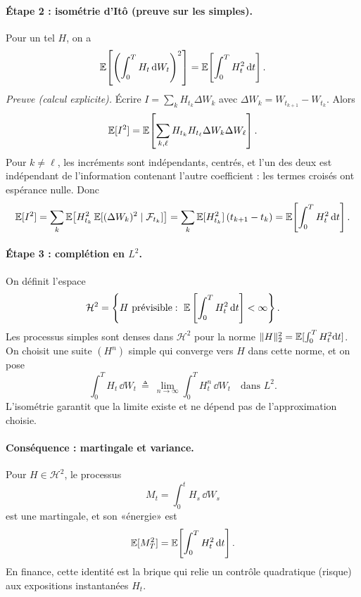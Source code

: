 \paragraph{Étape 2 : isométrie d'Itô (preuve sur les simples).}
Pour un tel $H$, on a
\[
\mathbb{E}\!\left[\left(\int_0^T H_t\,\mathrm{d} W_t\right)^2\right]
=\mathbb{E}\!\left[\int_0^T H_t^2\,\mathrm{d} t\right].
\]
\emph{Preuve (calcul explicite).}
Écrire $I=\sum_k H_{t_k}\Delta W_k$ avec $\Delta W_k=W_{t_{k+1}}-W_{t_k}$.
Alors
\[
\mathbb{E}[I^2]=\mathbb{E}\!\left[\sum_{k,\ell} H_{t_k}H_{t_\ell}\Delta W_k\Delta W_\ell\right].
\]
Pour $k\neq \ell$, les incréments sont indépendants, centrés, et l'un des deux est indépendant de l'information contenant l'autre coefficient : les termes croisés ont espérance nulle.
Donc
\[
\mathbb{E}[I^2]=\sum_k \mathbb{E}\!\left[H_{t_k}^2\,\mathbb{E}[(\Delta W_k)^2\mid \mathcal{F}_{t_k}]\right]
=\sum_k \mathbb{E}[H_{t_k}^2]\,(t_{k+1}-t_k)
=\mathbb{E}\!\left[\int_0^T H_t^2\,\mathrm{d} t\right].
\]

\paragraph{Étape 3 : complétion en $L^2$.}
On définit l'espace
\[
\mathcal{H}^2=\left\{H\ \text{prévisible}:\ \E\left[\int_0^T H_t^2\,\dd t\right]<\infty\right\}.
\]
Les processus simples sont denses dans $\mathcal{H}^2$ pour la norme $\|H\|_{2}^2=\mathbb{E}[\int_0^T H_t^2\mathrm{d} t]$.
On choisit une suite $(H^n)$ simple qui converge vers $H$ dans cette norme, et on pose
\[
\int_0^T H_t\,\dd W_t \ \triangleq\ \lim_{n\to\infty} \int_0^T H^n_t\,\dd W_t
\quad \text{dans } L^2.
\]
L'isométrie garantit que la limite existe et ne dépend pas de l'approximation choisie.

\paragraph{Conséquence : martingale et variance.}
Pour $H\in\mathcal{H}^2$, le processus
\[
M_t=\int_0^t H_s\,\dd W_s
\]
est une martingale, et son «énergie» est
\[
\mathbb{E}[M_T^2]=\mathbb{E}\!\left[\int_0^T H_t^2\,\mathrm{d} t\right].
\]
En finance, cette identité est la brique qui relie un contrôle quadratique (risque) aux expositions instantanées $H_t$.

